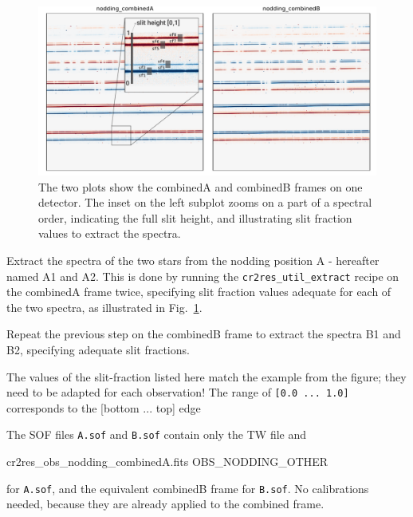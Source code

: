 \begin{figure}[!h]
  \begin{center}
    \includegraphics[width=1\textwidth]{figures/binary-nodding-combined}
  \end{center}
  \caption{
    \label{fig:binary-nodding}
    The two plots show the combinedA and combinedB frames
    on one detector. The inset on the left subplot zooms on a part of a
    spectral order, indicating the full slit height, 
    and illustrating slit fraction values to extract the spectra.}
\end{figure}

Extract the spectra of the two stars from the nodding position A -
hereafter named A1 and A2. This is done by running the \verb!cr2res_util_extract!
recipe on the combinedA frame twice, specifying slit fraction values adequate
for each of the two spectra, as illustrated in Fig.~\ref{fig:binary-nodding}.

Repeat the previous step on the combinedB frame to extract the spectra
B1 and B2, specifying adequate slit fractions.

\begin{shell}[fontsize=\small]
\end{shell}

The values of the slit-fraction listed here match the example from the figure;
they need to be adapted for each observation! The range of \verb![0.0 ... 1.0]!
corresponds to the [bottom ... top] edge 

The SOF files \verb!A.sof! and \verb!B.sof! contain only the TW file and
\begin{shell}[fontsize=\small]
    cr2res\_obs\_nodding\_combinedA.fits OBS_NODDING_OTHER
\end{shell}
for \verb!A.sof!, and the equivalent combinedB frame for \verb!B.sof!.
No calibrations needed, because they are already applied to the combined frame.

